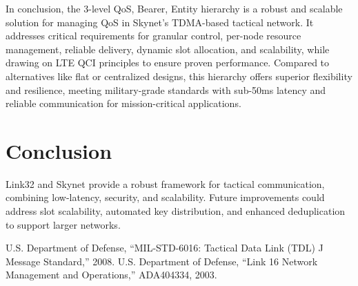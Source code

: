 \documentclass{article}
\begin{document}
In conclusion, the 3-level QoS, Bearer, Entity hierarchy is a robust and
scalable solution for managing QoS in Skynet's TDMA-based tactical network.
It addresses critical requirements for granular control, per-node resource
management, reliable delivery, dynamic slot allocation, and scalability,
while drawing on LTE QCI principles to ensure proven performance.
Compared to alternatives like flat or centralized designs,
this hierarchy offers superior flexibility and resilience,
meeting military-grade standards with sub-50ms latency and
reliable communication for mission-critical applications.

\section{Conclusion}
Link32 and Skynet provide a robust framework for tactical communication, combining low-latency,
security, and scalability. Future improvements could address slot scalability, automated key
distribution, and enhanced deduplication to support larger networks.

\begin{thebibliography}{10}
 U.S. Department of Defense, ``MIL-STD-6016: Tactical Data Link (TDL) J Message Standard,'' 2008.
 U.S. Department of Defense, ``Link 16 Network Management and Operations,'' ADA404334, 2003.
\end{thebibliography}
\end{document}
